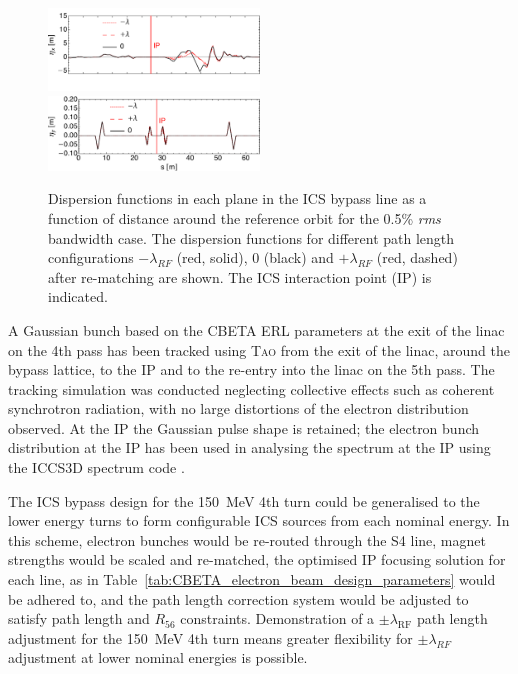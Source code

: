 \documentclass[../main.tex]{subfiles}
\begin{document}
\begin{figure}[!h]
\centering
\includegraphics[width=0.5\textwidth]{Figures/CBETA_Inverse_Compton_Source_Design/dispplotx.pdf}
\includegraphics[width=0.5\textwidth]{Figures/CBETA_Inverse_Compton_Source_Design/dispploty.pdf}
\caption{Dispersion functions in each plane in the ICS bypass line as a function of distance around the reference orbit for the 0.5\% \textit{rms} bandwidth case. The dispersion functions for different path length configurations $-\lambda_{RF}$ (red, solid), $0$ (black) and $+\lambda_{RF}$ (red, dashed) after re-matching are shown. The ICS interaction point (IP) is indicated.}
\label{fig:CBETA_ICS_dispersion}
\end{figure}

A Gaussian bunch based on the CBETA ERL parameters at the exit of the linac on the 4th pass has been tracked using \textsc{Tao} from the exit of the linac, around the bypass lattice, to the IP and to the re-entry into the linac on the 5th pass. The tracking simulation was conducted neglecting collective effects such as coherent synchrotron radiation, with no large distortions of the electron distribution observed. At the IP the Gaussian pulse shape is retained; the electron bunch distribution at the IP has been used in analysing the spectrum at the IP using the \textsc{ICCS3D} spectrum code \cite{krafft2016laser,ranjan2018simulation}.   

The ICS bypass design for the 150~\si{\mega\electronvolt} 4th turn could be generalised to the lower energy turns to form configurable ICS sources from each nominal energy. In this scheme, electron bunches would be re-routed through the S4 line, magnet strengths would be scaled and re-matched, the optimised IP focusing solution for each line, as in Table~\ref{tab:CBETA_electron_beam_design_parameters} would be adhered to, and the path length correction system would be adjusted to satisfy path length and $R_{56}$ constraints. Demonstration of a $\pm\lambda_{\mathrm{RF}}$ path length adjustment for the 150~\si{\mega\electronvolt} 4th turn means greater flexibility for $\pm\lambda_{RF}$ adjustment at lower nominal energies is possible.
\end{document}

